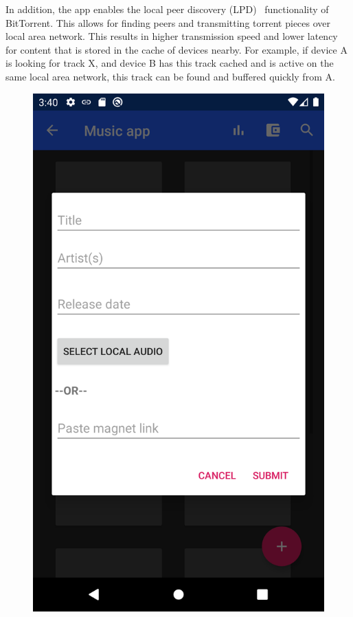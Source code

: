 In addition, the app enables the local peer discovery (LPD)~\citep{bittorrentbep142015} functionality of BitTorrent. This allows for finding peers and transmitting torrent pieces over local area network. This results in higher transmission speed and lower latency for content that is stored in the cache of devices nearby. For example, if device A is looking for track X, and device B has this track cached and is active on the same local area network, this track can be found and buffered quickly from A.
\begin{figure}
        \includegraphics[width=\linewidth]{implementation/screenshot-select-tracks.png}

\end{figure}

